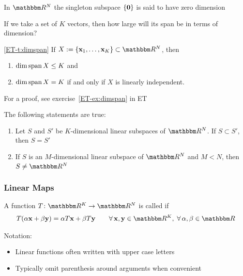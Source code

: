 \begin{frame}

    \vspace{2em}
    In $\RR^N$ the singleton subspace $\{{\mathbf 0}\}$ is said to have zero
    dimension

    If we take a set of $K$ vectors, then how large will its span be in terms
    of dimension?  
    
    \vspace{.7em}
    \Thm\eqref{ET-t:dimspan}
        If $X := \{\boldx_1,\ldots,\boldx_K\} \subset \RR^N$, then
        \begin{enumerate}
            \item $\dim \operatorname{span} X \leq K$ and
            \item $\dim \operatorname{span} X = K$ if and only if $X$ is linearly independent.
        \end{enumerate}
    For a proof, see exercise~\ref{ET-ex:dimspan} in ET
    
\end{frame}

\begin{frame}

    \vspace{2em}
    \Fact{\eqref{ET-fa:ondsrn}}
        The following statements are true:
        \begin{enumerate}
            \item Let $S$ and $S'$ be $K$-dimensional linear subspaces of $\RR^N$. If $S
                \subset S'$, then $S = S'$
            \item If $S$ is an $M$-dimensional linear subspace of $\RR^N$ and $M
                < N$, then $S \not= \RR^N$
        \end{enumerate}
        
\end{frame}



\begin{frame}\frametitle{Linear Maps}

    \vspace{2em}
    A function $T \colon \RR^K \to \RR^N$ is called
     if 
    \begin{equation*}
            T(\alpha \boldx + \beta \boldy) = \alpha T\boldx + \beta T\boldy
            \qquad
            \forall \, 
            \boldx, \boldy \in \RR^K, \;
            \forall \,
            \alpha, \beta \in \RR
    \end{equation*}

    \vspace{.7em}
    Notation: 
    
    \begin{itemize}
        \item Linear functions often written with upper case letters
            \vspace{0.5em}
        \item Typically omit parenthesis around arguments when convenient
    \end{itemize}

\end{frame}

